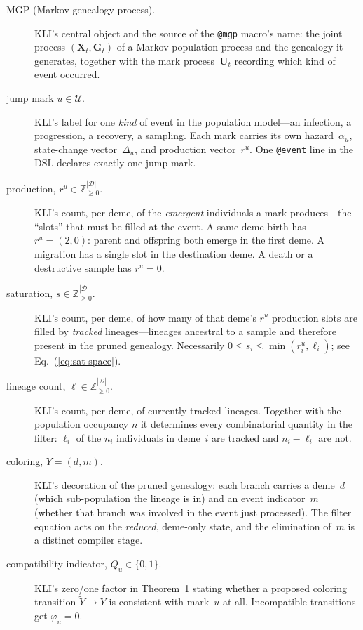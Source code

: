 \documentclass[11pt,leqno]{article}
\newcommand{\Xr}{\mathbf{X}}        %
\newcommand{\Gr}{\mathbf{G}}        %
\newcommand{\Ur}{\mathbf{U}}        %
\newcommand{\Jumps}{\mathcal{U}}    %
\newcommand{\Demes}{\mathcal{D}}    %
\newcommand{\Zp}{\mathbb{Z}_{\ge 0}}
\newcommand{\code}[1]{\texttt{#1}}
\theoremstyle{plain}
\theoremstyle{definition}
\begin{document}
\begin{description}

\item[MGP (Markov genealogy process).]  KLI's central object and the source
  of the \code{@mgp} macro's name: the joint process
  $(\Xr_t, \Gr_t)$ of a Markov population process and the genealogy it
  generates, together with the mark process~$\Ur_t$ recording which kind of
  event occurred.

\item[jump mark $u \in \Jumps$.]  KLI's label for one \emph{kind} of event
  in the population model---an infection, a progression, a recovery, a
  sampling.  Each mark carries its own hazard~$\alpha_u$, state-change
  vector~$\Delta_u$, and production vector~$r^u$.  One \code{@event} line in
  the DSL declares exactly one jump mark.

\item[production, $r^u \in \Zp^{|\Demes|}$.]  KLI's count, per deme, of the
  \emph{emergent} individuals a mark produces---the ``slots'' that must be
  filled at the event.  A same-deme birth has $r^u = (2,0)$: parent and
  offspring both emerge in the first deme.  A migration has a single slot in
  the destination deme.  A death or a destructive sample has $r^u = 0$.

\item[saturation, $s \in \Zp^{|\Demes|}$.]  KLI's count, per deme, of how
  many of that deme's $r^u$ production slots are filled by \emph{tracked}
  lineages---lineages ancestral to a sample and therefore present in the
  pruned genealogy.  Necessarily $0 \le s_i \le \min(r^u_i, \ell_i)$;
  see Eq.~(\ref{eq:sat-space}).

\item[lineage count, $\ell \in \Zp^{|\Demes|}$.]  KLI's count, per deme, of
  currently tracked lineages.  Together with the population occupancy $n$ it
  determines every combinatorial quantity in the filter: $\ell_i$ of the
  $n_i$ individuals in deme~$i$ are tracked and $n_i - \ell_i$ are not.

\item[coloring, $Y = (d, m)$.]  KLI's decoration of the pruned genealogy:
  each branch carries a deme~$d$ (which sub-population the lineage is in)
  and an event indicator~$m$ (whether that branch was involved in the event
  just processed).  The filter equation acts on the \emph{reduced},
  deme-only state, and the elimination of~$m$ is a distinct compiler stage.

\item[compatibility indicator, $Q_u \in \{0,1\}$.]  KLI's zero/one factor in
  Theorem~1 stating whether a proposed coloring transition
  $\tilde{Y} \to Y$ is consistent with mark~$u$ at all.  Incompatible
  transitions get $\varphi_u = 0$.


\end{description}
\end{document}
